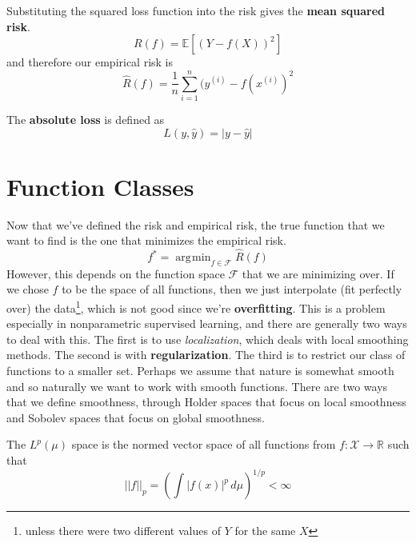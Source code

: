 \documentclass{article}
\DeclareMathOperator*{\argmin}{\arg\!\min}
\begin{document}
  \begin{example}
    Substituting the squared loss function into the risk gives the \textbf{mean squared risk}. 
    \begin{equation}
      R(f) = \mathbb{E}[(Y - f(X))^2]
    \end{equation}
    and therefore our empirical risk is 
    \begin{equation}
      \hat{R} (f) = \frac{1}{n} \sum_{i=1}^n (y^{(i)} - f(x^{(i)})^2
    \end{equation}
  \end{example}

  \begin{definition}
    The \textbf{absolute loss} is defined as 
    \begin{equation}
      L(y, \hat{y}) = |y - \hat{y}|
    \end{equation}
  \end{definition}

\section{Function Classes}

  Now that we've defined the risk and empirical risk, the true function that we want to find is the one that minimizes the empirical risk. 
  \begin{equation}
    f^\ast = \argmin_{f \in \mathcal{F}} \hat{R} (f)
  \end{equation}
  However, this depends on the function space $\mathcal{F}$ that we are minimizing over. If we chose $f$ to be the space of all functions, then we just interpolate (fit perfectly over) the data\footnote{unless there were two different values of $Y$ for the same $X$}, which is not good since we're \textbf{overfitting}. This is a problem especially in nonparametric supervised learning, and there are generally two ways to deal with this. The first is to use \textit{localization}, which deals with local smoothing methods. The second is with \textbf{regularization}. The third is to restrict our class of functions to a smaller set. Perhaps we assume that nature is somewhat smooth and so naturally we want to work with smooth functions. There are two ways that we define smoothness, through Holder spaces that focus on local smoothness and Sobolev spaces that focus on global smoothness. 

  \begin{definition}[$L^p$ Space]
    The $L^p (\mu)$ space is the normed vector space of all functions from $f: \mathcal{X} \rightarrow \mathbb{R}$ such that 
    \begin{equation}
      ||f||_p = \left( \int |f(x)|^p \,d\mu \right)^{1/p} < \infty
    \end{equation}
  \end{definition}
\end{document}
